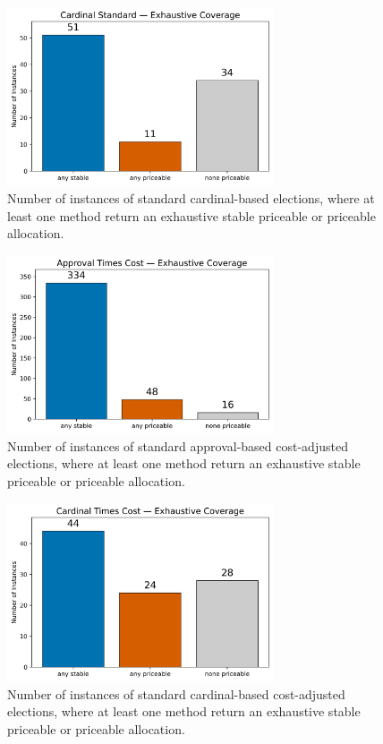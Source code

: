 \begin{figure}[H]         
  \centering              
  \includegraphics[width=0.7\textwidth]{figures/plots/cardinal-standard/cardinal_standard_coverage_exhaustive.png}
  \caption{Number of instances of standard cardinal-based elections, where at least one method return an exhaustive stable priceable or priceable allocation.}
  \label{fig:myplot}
\end{figure}
\begin{figure}[H]         
  \centering              
  \includegraphics[width=0.7\textwidth]{figures/plots/approval-times-cost/approval_times_cost_coverage_exhaustive.png}
  \caption{Number of instances of standard approval-based cost-adjusted elections, where at least one method return an exhaustive stable priceable or priceable allocation.}
  \label{fig:myplot}
\end{figure}
\begin{figure}[H]         
  \centering              
  \includegraphics[width=0.7\textwidth]{figures/plots/cardinal-times-cost/cardinal_times_cost_coverage_exhaustive.png}
  \caption{Number of instances of standard cardinal-based cost-adjusted elections, where at least one method return an exhaustive stable priceable or priceable allocation.}  \label{fig:myplot}
\end{figure}
